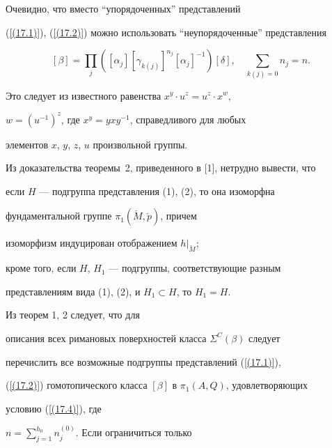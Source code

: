 \begin{note}


Очевидно, что вместо ``упорядоченных'' представлений


(\ref{(17.1)}), (\ref{(17.2)}) можно использовать ``неупорядоченные'' представления


$$


[\beta]=\prod_j([\alpha_{{j}}][\gamma_{{k(j)}}]^{{n}_{{j}}}


[\alpha_{{j}}]^{{-1}}) [\delta],\quad 


\sum_{k(j)=0}n_j=n.


$$


Это следует из известного равенства $x^y\cdot u^z=u^z\cdot x^w$,


$w=(u^{-1})^z$, где $x^y=yxy^{-1}$, справедливого для любых


элементов $x$, $y$, $z$, $u$ произвольной группы.


\end{note}





\begin{note}


Из доказательства теоремы~2, приведенного в [1], нетрудно вывести, что


если $H$ --- подгруппа представления (1), (2), то она изоморфна


фундаментальной группе $\pi_1(\check M,\check p)$, причем


изоморфизм индуцирован отображением $h|_{\check{M}}$;


кроме того, если $H$, $H_1$ --- подгруппы, соответствующие разным


представлениям вида (1), (2), и $H_1\subset H$, то $H_1=H$.


\end{note}





Из теорем 1, 2 следует, что для


описания всех римановых поверхностей класса $\Sigma^C(\beta)$ следует


перечислить все возможные подгруппы представлений (\ref{(17.1)}),


(\ref{(17.2)}) гомотопического класса $[\beta]$ в $\pi_1(A,Q)$, удовлетворяющих


условию (\ref{(17.4)}), где


$n=\sum\limits^{h_0}_{j=1}n^{(0)}_{j}$. Если ограничиться только



